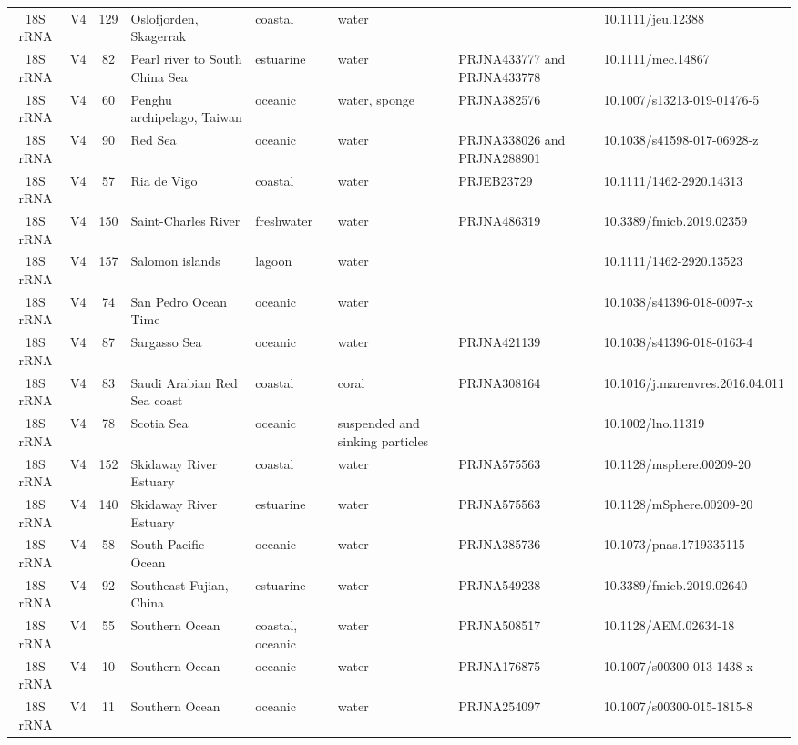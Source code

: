 \begin{longtable}{ccclllll}
  18S rRNA & V4 & 129 & Oslofjorden, Skagerrak & coastal & water &  & 10.1111/jeu.12388 \\ 
  18S rRNA & V4 & 82 & Pearl river to South China Sea & estuarine & water & PRJNA433777 and PRJNA433778 & 10.1111/mec.14867 \\ 
  18S rRNA & V4 & 60 & Penghu archipelago, Taiwan & oceanic & water, sponge & PRJNA382576 & 10.1007/s13213-019-01476-5 \\ 
  18S rRNA & V4 & 90 & Red Sea & oceanic & water & PRJNA338026 and PRJNA288901  & 10.1038/s41598-017-06928-z \\ 
  18S rRNA & V4 & 57 & Ria de Vigo & coastal & water & PRJEB23729 & 10.1111/1462-2920.14313 \\ 
  18S rRNA & V4 & 150 & Saint-Charles River & freshwater & water & PRJNA486319 & 10.3389/fmicb.2019.02359 \\ 
  18S rRNA & V4 & 157 & Salomon islands & lagoon & water &  & 10.1111/1462-2920.13523 \\ 
  18S rRNA & V4 & 74 & San Pedro Ocean Time & oceanic & water &  & 10.1038/s41396-018-0097-x \\ 
  18S rRNA & V4 & 87 & Sargasso Sea & oceanic & water & PRJNA421139  & 10.1038/s41396-018-0163-4 \\ 
  18S rRNA & V4 & 83 & Saudi Arabian Red Sea coast & coastal & coral & PRJNA308164  & 10.1016/j.marenvres.2016.04.011 \\ 
  18S rRNA & V4 & 78 & Scotia Sea & oceanic & suspended and sinking particles &  & 10.1002/lno.11319 \\ 
  18S rRNA & V4 & 152 & Skidaway River Estuary & coastal & water & PRJNA575563  & 10.1128/msphere.00209-20 \\ 
  18S rRNA & V4 & 140 & Skidaway River Estuary & estuarine & water & PRJNA575563  & 10.1128/mSphere.00209-20 \\ 
  18S rRNA & V4 & 58 & South Pacific Ocean & oceanic & water & PRJNA385736 & 10.1073/pnas.1719335115 \\ 
  18S rRNA & V4 & 92 & Southeast Fujian, China & estuarine & water & PRJNA549238 & 10.3389/fmicb.2019.02640 \\ 
  18S rRNA & V4 & 55 & Southern Ocean & coastal, oceanic & water & PRJNA508517 & 10.1128/AEM.02634-18 \\ 
  18S rRNA & V4 & 10 & Southern Ocean & oceanic & water & PRJNA176875 & 10.1007/s00300-013-1438-x \\ 
  18S rRNA & V4 & 11 & Southern Ocean & oceanic & water &  PRJNA254097 & 10.1007/s00300-015-1815-8 \\ 

\end{longtable}
